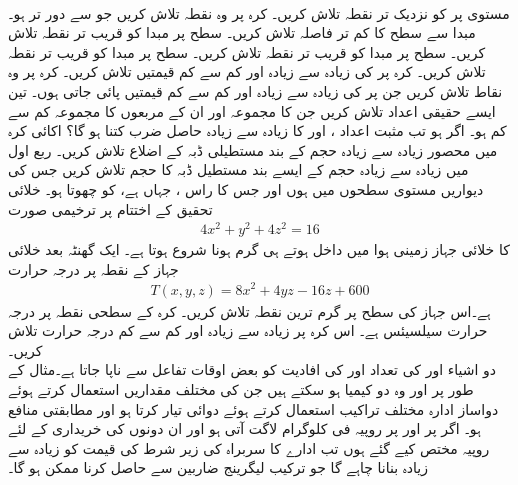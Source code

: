 \\
مستوی  پر  کو  نزدیک تر نقطہ تلاش کریں۔
کرہ   پر وہ نقطہ تلاش کریں جو  سے  دور تر ہو۔
مبدا سے سطح  کا کم تر فاصلہ تلاش کریں۔
سطح  پر مبدا کو قریب تر نقطہ تلاش کریں۔
سطح  پر مبدا کو قریب تر نقطہ تلاش کریں۔
سطح  پر مبدا کو قریب تر نقطہ تلاش کریں۔
کرہ  پر کی زیادہ سے زیادہ اور کم سے کم قیمتیں تلاش کریں۔
کرہ  پر وہ نقاط تلاش کریں جن پر  کی زیادہ سے زیادہ اور کم سے کم قیمتیں پائی جاتی ہوں۔
تین ایسے حقیقی اعداد تلاش کریں جن کا مجموعہ   اور ان کے مربعوں کا مجموعہ کم سے کم ہو۔ 
اگر  ہو تب مثبت اعداد  ،  اور  کا زیادہ سے زیادہ حاصل ضرب کتنا ہو گا؟
اکائی کرہ میں محصور   زیادہ سے زیادہ حجم کے  بند مستطیلی ڈبہ کے اضلاع تلاش کریں۔
ربع اول میں  زیادہ سے زیادہ حجم کے ایسے بند  مستطیل ڈبہ کا حجم تلاش کریں جس کی دیواریں مستوی سطحوں میں ہوں اور جس کا راس ، جہاں  ہے، کو چھوتا ہو۔
خلائی تحقیق کے اختتام  پر ترخیمی  صورت
\begin{align*}
4x^2+y^2+4z^2=16
\end{align*}
کا خلائی جہاز  زمینی ہوا میں داخل ہوتے ہی گرم ہونا شروع ہوتا ہے۔ ایک گھنٹہ بعد  خلائی جہاز کے نقطہ  پر درجہ حرارت
\begin{align*}
T(x,y,z)=8x^2+4yz-16z+600
\end{align*}
ہے۔اس جہاز کی  سطح پر گرم ترین نقطہ تلاش کریں۔
کرہ   کے سطحی نقطہ  پر درجہ حرارت   سیلسیئس ہے۔ اس کرہ پر زیادہ سے زیادہ اور کم سے کم درجہ حرارت تلاش کریں۔
\\
دو   اشیاء  اور  کی تعداد  اور  کی افادیت   کو بعض اوقات تفاعل   سے ناپا جاتا ہے۔مثال کے طور پر  اور وہ دو   کیمیا ہو سکتے ہیں جن کی مختلف مقداریں  استعمال کرتے ہوئے   دواساز ادارہ  مختلف  تراکیب   استعمال  کرتے ہوئے    دوائی تیار کرتا ہو اور مطابقتی  منافع  ہو۔ اگر   پر  اور  پر  روپیہ فی کلوگرام لاگت آتی ہو اور ان دونوں کی خریداری کے لئے   روپیہ مختص کیے  گئے ہوں تب ادارے  کا سربراہ  کی زیر  شرط   کی قیمت کو زیادہ سے زیادہ بنانا چاہے گا جو  ترکیب لیگرینج ضاربین سے حاصل کرنا ممکن ہو گا۔

